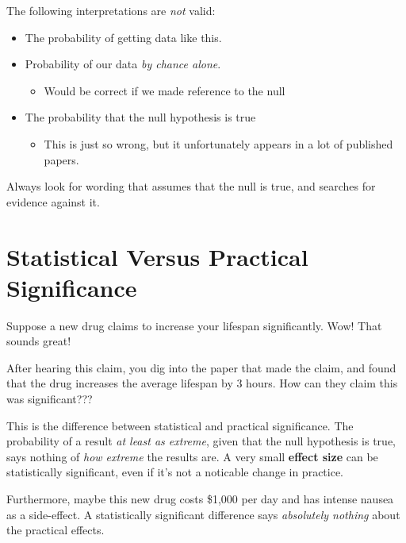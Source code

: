 \documentclass[
  letterpaper,
  DIV=11,
  numbers=noendperiod,
  oneside]{scrreprt}
\providecommand{\tightlist}{%
  \setlength{\itemsep}{0pt}\setlength{\parskip}{0pt}}\usepackage{longtable,booktabs,array}
\begin{document}
The following interpretations are \emph{not} valid:

\begin{itemize}
\tightlist
\item
  The probability of getting data like this.
\item
  Probability of our data \emph{by chance alone}.

  \begin{itemize}
  \tightlist
  \item
    Would be correct if we made reference to the null
  \end{itemize}
\item
  The probability that the null hypothesis is true

  \begin{itemize}
  \tightlist
  \item
    This is just so wrong, but it unfortunately appears in a lot of
    published papers.
  \end{itemize}
\end{itemize}

Always look for wording that assumes that the null is true, and searches
for evidence against it.

\hypertarget{statistical-versus-practical-significance}{%
\section{Statistical Versus Practical
Significance}\label{statistical-versus-practical-significance}}

Suppose a new drug claims to increase your lifespan significantly. Wow!
That sounds great!

After hearing this claim, you dig into the paper that made the claim,
and found that the drug increases the average lifespan by 3 hours. How
can they claim this was significant???

This is the difference between statistical and practical significance.
The probability of a result \emph{at least as extreme}, given that the
null hypothesis is true, says nothing of \emph{how extreme} the results
are. A very small \textbf{effect size} can be statistically significant,
even if it's not a noticable change in practice.

Furthermore, maybe this new drug costs \$1,000 per day and has intense
nausea as a side-effect. A statistically significant difference says
\emph{absolutely nothing} about the practical effects.
\end{document}
